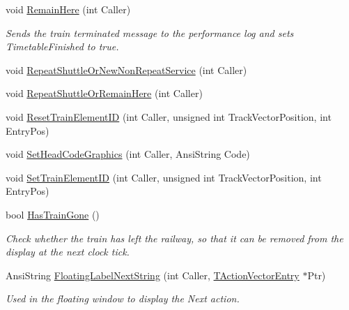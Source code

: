 \begin{DoxyCompactItemize}
void \mbox{\hyperlink{class_t_train_abd68a68b5ce295ee01171615f3d2c7ec}{Remain\+Here}} (int Caller)
\begin{DoxyCompactList}\small\item\em Sends the \textquotesingle{}train terminated\textquotesingle{} message to the performance log and sets Timetable\+Finished to true. \end{DoxyCompactList}\item 
void \mbox{\hyperlink{class_t_train_a8262f447ec811db7e524c7bb885226c5}{Repeat\+Shuttle\+Or\+New\+Non\+Repeat\+Service}} (int Caller)
\item 
void \mbox{\hyperlink{class_t_train_ac6f5cda912103fda4da31bdca611e4b5}{Repeat\+Shuttle\+Or\+Remain\+Here}} (int Caller)
\item 
void \mbox{\hyperlink{class_t_train_ace302d98b5685104d294869b161e20a0}{Reset\+Train\+Element\+ID}} (int Caller, unsigned int Track\+Vector\+Position, int Entry\+Pos)
\item 
void \mbox{\hyperlink{class_t_train_a594228489e522dfde0ffbe124cd27103}{Set\+Head\+Code\+Graphics}} (int Caller, Ansi\+String Code)
\item 
void \mbox{\hyperlink{class_t_train_a0e0ab54415645b04cbdeadd829d27898}{Set\+Train\+Element\+ID}} (int Caller, unsigned int Track\+Vector\+Position, int Entry\+Pos)
\item 
\mbox{\label{class_t_train_af95a34f2334cb991841c24997d445ae3}} 
bool \mbox{\hyperlink{class_t_train_af95a34f2334cb991841c24997d445ae3}{Has\+Train\+Gone}} ()
\begin{DoxyCompactList}\small\item\em Check whether the train has left the railway, so that it can be removed from the display at the next clock tick. \end{DoxyCompactList}\item 
\mbox{\label{class_t_train_a221da69cd80d206a06f840f4cd463cf9}} 
Ansi\+String \mbox{\hyperlink{class_t_train_a221da69cd80d206a06f840f4cd463cf9}{Floating\+Label\+Next\+String}} (int Caller, \mbox{\hyperlink{class_t_action_vector_entry}{T\+Action\+Vector\+Entry}} $\ast$Ptr)
\begin{DoxyCompactList}\small\item\em Used in the floating window to display the \textquotesingle{}Next\textquotesingle{} action. \end{DoxyCompactList}\item 

\end{DoxyCompactItemize}
